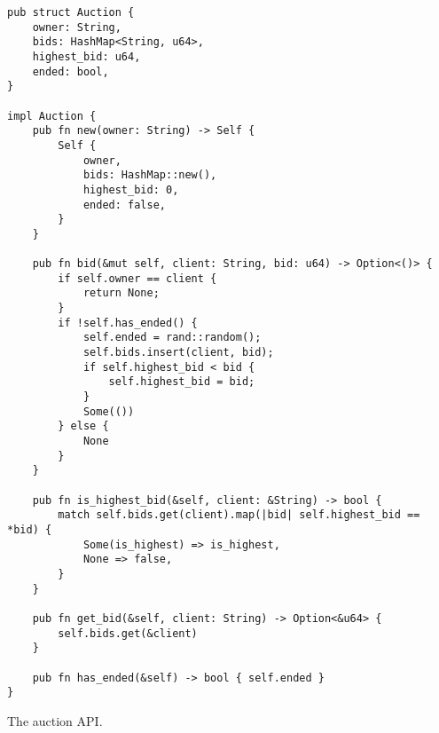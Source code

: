\begin{listing}
    \begin{verbatim}
pub struct Auction {
    owner: String,
    bids: HashMap<String, u64>,
    highest_bid: u64,
    ended: bool,
}

impl Auction {
    pub fn new(owner: String) -> Self {
        Self {
            owner,
            bids: HashMap::new(),
            highest_bid: 0,
            ended: false,
        }
    }

    pub fn bid(&mut self, client: String, bid: u64) -> Option<()> {
        if self.owner == client {
            return None;
        }
        if !self.has_ended() {
            self.ended = rand::random();
            self.bids.insert(client, bid);
            if self.highest_bid < bid {
                self.highest_bid = bid;
            }
            Some(())
        } else {
            None
        }
    }

    pub fn is_highest_bid(&self, client: &String) -> bool {
        match self.bids.get(client).map(|bid| self.highest_bid == *bid) {
            Some(is_highest) => is_highest,
            None => false,
        }
    }

    pub fn get_bid(&self, client: String) -> Option<&u64> {
        self.bids.get(&client)
    }

    pub fn has_ended(&self) -> bool { self.ended }
}
    \end{verbatim}
    \caption{The auction API.}
    \label{lst:typestate-auction}
\end{listing}

